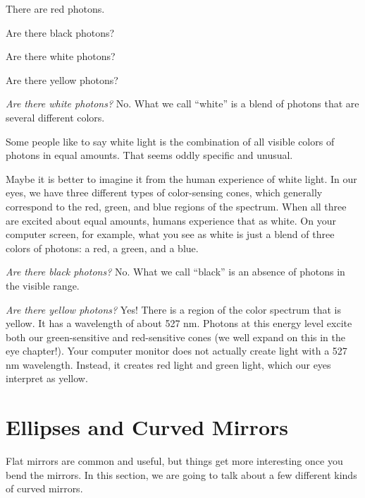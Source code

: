 \begin{Exercise}[title={Photons and Color}, label=photon_color]

  There are red photons.

  Are there black photons?

  Are there white photons?

  Are there yellow photons?

\end{Exercise}
\begin{Answer}

  \textit{Are there white photons?}  No. What we call ``white'' is a
  blend of photons that are several different colors.

  Some people like to say white light is the combination of all visible
  colors of photons in equal amounts. That seems oddly specific and unusual.

  Maybe it is better to imagine it from the human experience of white
  light. In our eyes, we have three different types of color-sensing
  cones, which generally correspond to the red, green, and
  blue regions of the spectrum. When all three are excited about equal
  amounts, humans experience that as white. On your computer screen,
  for example, what you see as white is just a blend of three colors of
  photons: a red, a green, and a blue.

  \textit{Are there black photons?}  No. What we call ``black'' is an
  absence of photons in the visible range.

  \textit{Are there yellow photons?} Yes! There is a region of the color
  spectrum that is yellow. It has a wavelength of about 527 nm. Photons
  at this energy level excite both our green-sensitive and red-sensitive
  cones (we well expand on this in the eye chapter!).
  Your computer monitor does not actually create light with a 527 nm
  wavelength. Instead, it creates red light and green light, which our
  eyes interpret as yellow.

\end{Answer}

\section{Ellipses and Curved Mirrors}

Flat mirrors are common and useful, but things get more interesting
once you bend the mirrors. In this section, we are going to talk about
a few different kinds of curved mirrors.

